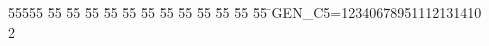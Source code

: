 %
%
\begin{tabbing}
55555 \= 55 \= 55 \= 55 \= 55 \= 55 \= 55 \= 55 \= 55 \= 55 \= 55 \= 55 \= 55 \= \>GEN\_C5=12340678951112131410\\[0pt]
2\>\end{tabbing}
